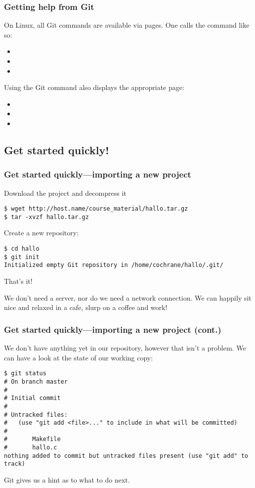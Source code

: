 \begin{frame}[fragile]
\frametitle{Getting help from Git}

On Linux, all Git commands are available via  pages.  One calls
the command like so:
\begin{itemize}
    \item {}
    \item {}
    \item {}
\end{itemize}

Using the Git  command also displays the appropriate
 page:
\begin{itemize}
    \item {}
    \item {}
    \item {}
\end{itemize}
\end{frame}

\subsection{Get started quickly!}
\begin{frame}[fragile]
\frametitle{Get started quickly---importing a new project}
Download the  project and decompress it
\begin{lstlisting}
$ wget http://host.name/course_material/hallo.tar.gz
$ tar -xvzf hallo.tar.gz
\end{lstlisting}

Create a new repository: 
\begin{lstlisting}
$ cd hallo
$ git init
Initialized empty Git repository in /home/cochrane/hallo/.git/
\end{lstlisting}
That's it!

We don't need a server, nor do we need a network connection.  We can
happily sit nice and relaxed in a cafe, slurp on a coffee and work!
\end{frame}

\begin{frame}[fragile]
\frametitle{Get started quickly---importing a new project (cont.)}
We don't have anything yet in our repository, however that isn't a problem.
We can have a look at the state of our working copy:

\begin{lstlisting}
$ git status
# On branch master
#
# Initial commit
#
# Untracked files:
#   (use "git add <file>..." to include in what will be committed)
#
#       Makefile
#       hallo.c
nothing added to commit but untracked files present (use "git add" to track)
\end{lstlisting}
Git gives us a hint as to what to do next.
\end{frame}

